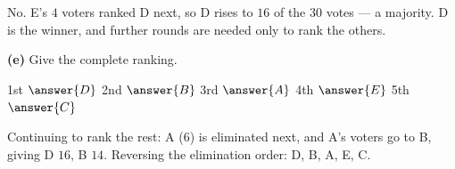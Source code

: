 \documentclass[12pt]{ximera}
\begin{document}
\begin{problem}
\begin{prompt}
\begin{feedback}
No. E's $4$ voters ranked D next, so D rises to $16$ of the $30$ votes --- a majority.
D is the winner, and further rounds are needed only to rank the others.
\end{feedback}
\end{prompt}

\begin{prompt}
\textbf{(e)} Give the complete ranking.

1st $\answer{D}$ \quad 2nd $\answer{B}$ \quad 3rd $\answer{A}$ \quad 4th $\answer{E}$
\quad 5th $\answer{C}$

\begin{feedback}
Continuing to rank the rest: A ($6$) is eliminated next, and A's voters go to B, giving
D $16$, B $14$. Reversing the elimination order: D, B, A, E, C.
\end{feedback}
\end{prompt}
\end{problem}
\end{document}
